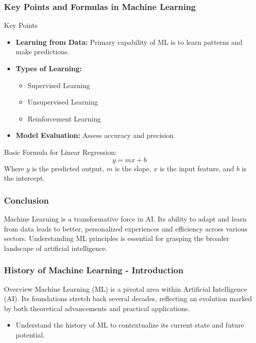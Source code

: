 \documentclass{beamer}
\begin{document}
\begin{frame}[fragile]
    \frametitle{Key Points and Formulas in Machine Learning}
    \begin{block}{Key Points}
        \begin{itemize}
            \item \textbf{Learning from Data:} Primary capability of ML is to learn patterns and make predictions.
            \item \textbf{Types of Learning:}
                \begin{itemize}
                    \item Supervised Learning
                    \item Unsupervised Learning
                    \item Reinforcement Learning
                \end{itemize}
            \item \textbf{Model Evaluation:} Assess accuracy and precision.
        \end{itemize}
    \end{block}
    \begin{block}{Basic Formula for Linear Regression:}
        \begin{equation}
            y = mx + b
        \end{equation}
        Where \(y\) is the predicted output, \(m\) is the slope, \(x\) is the input feature, and \(b\) is the intercept.
    \end{block}
\end{frame}

\begin{frame}[fragile]
    \frametitle{Conclusion}
    Machine Learning is a transformative force in AI. Its ability to adapt and learn from data leads to better, personalized experiences and efficiency across various sectors. Understanding ML principles is essential for grasping the broader landscape of artificial intelligence.
\end{frame}

\begin{frame}[fragile]
    \frametitle{History of Machine Learning - Introduction}
    \begin{block}{Overview}
        Machine Learning (ML) is a pivotal area within Artificial Intelligence (AI). Its foundations stretch back several decades, reflecting an evolution marked by both theoretical advancements and practical applications. 
    \end{block}
    \begin{itemize}
        \item Understand the history of ML to contextualize its current state and future potential.
    \end{itemize}
\end{frame}
\end{document}
